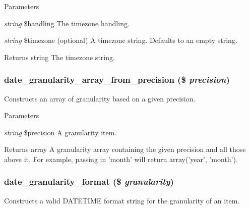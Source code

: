 \begin{DoxyParams}{Parameters}
\item[{\em string}]\$handling The timezone handling. \item[{\em string}]\$timezone (optional) A timezone string. Defaults to an empty string.\end{DoxyParams}
\begin{DoxyReturn}{Returns}
string The timezone string. 
\end{DoxyReturn}
\hypertarget{date__api_8module_a25e9d06fc1a832df3fa5ce5989039dcf}{
\subsubsection[{date\_\-granularity\_\-array\_\-from\_\-precision}]{\setlength{\rightskip}{0pt plus 5cm}date\_\-granularity\_\-array\_\-from\_\-precision (\$ {\em precision})}}
\label{date__api_8module_a25e9d06fc1a832df3fa5ce5989039dcf}
Constructs an array of granularity based on a given precision.


\begin{DoxyParams}{Parameters}
\item[{\em string}]\$precision A granularity item.\end{DoxyParams}
\begin{DoxyReturn}{Returns}
array A granularity array containing the given precision and all those above it. For example, passing in 'month' will return array('year', 'month'). 
\end{DoxyReturn}
\hypertarget{date__api_8module_ab17bb31df64a3d11cf8bddb49f5e20fd}{
\subsubsection[{date\_\-granularity\_\-format}]{\setlength{\rightskip}{0pt plus 5cm}date\_\-granularity\_\-format (\$ {\em granularity})}}
\label{date__api_8module_ab17bb31df64a3d11cf8bddb49f5e20fd}
Constructs a valid DATETIME format string for the granularity of an item.


